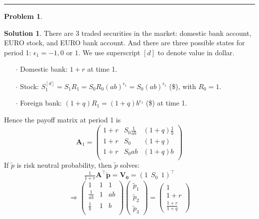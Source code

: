 \documentclass[a4paper, 10pt]{article}
\theoremstyle{definition}
\newtheorem{problem}{Problem}
\theoremstyle{hSol}
\newtheorem*{solution}{Solution}
\begin{document}
\noindent\rule{16cm}{0.4pt}
\begin{problem} 
\end{problem}
\begin{solution} There are 3 traded securities in the market: domestic bank account, EURO stock, and EURO bank account. And there are three possible states for period 1: $\epsilon_1 = -1, 0$ or $1$. We use superscript $[d]$ to denote value in dollar.
\begin{itemize}
   \item[$\cdot$] Domestic bank: $1+r$ at time 1.
   \item[$\cdot$] Stock: $S_1^{[d]} = S_1 R_1 = S_0 R_0 (ab)^{\epsilon_1} = S_0 (ab)^{\epsilon_1}$ (\$), with $R_0=1$.
   \item[$\cdot$] Foreign bank: $(1+q)R_1 = (1+q)b^{\epsilon_1}$ (\$) at time 1.
 \end{itemize} 
Hence the payoff matrix at period 1 is
\begin{equation}
  \bm{A}_1 = \begin{pmatrix}
    1+r & S_0\tfrac{1}{ab}& (1+q)\tfrac{1}{b} \\
    1+r & S_0& (1+q) \\
    1+r & S_0ab& (1+q)b\\
  \end{pmatrix}
\end{equation}
If $\tilde{p}$ is risk neutral probability, then $\tilde{p}$ solves:
\begin{equation}
  \tfrac{1}{1+r}\bm{A}^{\top} \tilde{\bm{p}} = \bm{V_0} = (1~~S_0~~1)^{\top}
\end{equation}
\begin{equation}
  \Rightarrow \begin{pmatrix}
    1 & 1 & 1 \\
    \tfrac{1}{ab} & 1& ab \\
    \tfrac{1}{b} & 1& b\\
  \end{pmatrix} \begin{pmatrix}
    \tilde{p}_1\\
    \tilde{p}_2 \\
    \tilde{p}_3
  \end{pmatrix} = \begin{pmatrix}
    1 \\
    1+r \\
    \frac{1+r}{1+q}
  \end{pmatrix}
\end{equation}

\end{solution}
\end{document}
